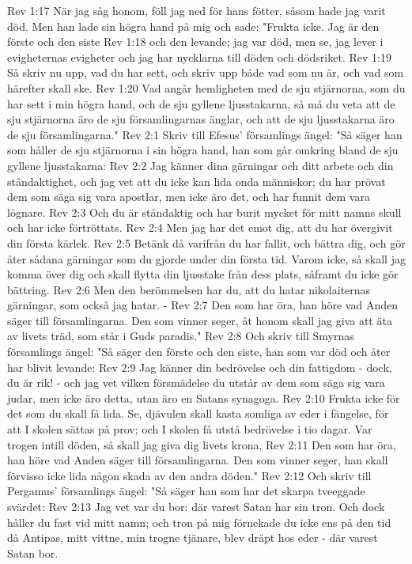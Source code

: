 Rev 1:17  När jag såg honom, föll jag ned för hans fötter, såsom hade jag varit död. Men han lade sin högra hand på mig och sade: "Frukta icke. Jag är den förste och den siste
Rev 1:18  och den levande; jag var död, men se, jag lever i evigheternas evigheter och jag har nycklarna till döden och dödsriket.
Rev 1:19  Så skriv nu upp, vad du har sett, och skriv upp både vad som nu är, och vad som härefter skall ske.
Rev 1:20  Vad angår hemligheten med de sju stjärnorna, som du har sett i min högra hand, och de sju gyllene ljusstakarna, så må du veta att de sju stjärnorna äro de sju församlingarnas änglar, och att de sju ljusstakarna äro de sju församlingarna."
Rev 2:1  Skriv till Efesus' församlings ängel: "Så säger han som håller de sju stjärnorna i sin högra hand, han som går omkring bland de sju gyllene ljusstakarna:
Rev 2:2  Jag känner dina gärningar och ditt arbete och din ståndaktighet, och jag vet att du icke kan lida onda människor; du har prövat dem som säga sig vara apostlar, men icke äro det, och har funnit dem vara lögnare.
Rev 2:3  Och du är ståndaktig och har burit mycket för mitt namns skull och har icke förtröttats.
Rev 2:4  Men jag har det emot dig, att du har övergivit din första kärlek.
Rev 2:5  Betänk då varifrån du har fallit, och bättra dig, och gör åter sådana gärningar som du gjorde under din första tid. Varom icke, så skall jag komma över dig och skall flytta din ljusstake från dess plats, såframt du icke gör bättring.
Rev 2:6  Men den berömmelsen har du, att du hatar nikolaiternas gärningar, som också jag hatar. -
Rev 2:7  Den som har öra, han höre vad Anden säger till församlingarna. Den som vinner seger, åt honom skall jag giva att äta av livets träd, som står i Guds paradis."
Rev 2:8  Och skriv till Smyrnas församlings ängel: "Så säger den förste och den siste, han som var död och åter har blivit levande:
Rev 2:9  Jag känner din bedrövelse och din fattigdom - dock, du är rik! - och jag vet vilken försmädelse du utstår av dem som säga sig vara judar, men icke äro detta, utan äro en Satans synagoga.
Rev 2:10  Frukta icke för det som du skall få lida. Se, djävulen skall kasta somliga av eder i fängelse, för att I skolen sättas på prov; och I skolen få utstå bedrövelse i tio dagar. Var trogen intill döden, så skall jag giva dig livets krona,
Rev 2:11  Den som har öra, han höre vad Anden säger till församlingarna. Den som vinner seger, han skall förvisso icke lida någon skada av den andra döden."
Rev 2:12  Och skriv till Pergamus' församlings ängel: "Så säger han som har det skarpa tveeggade svärdet:
Rev 2:13  Jag vet var du bor: där varest Satan har sin tron. Och dock håller du fast vid mitt namn; och tron på mig förnekade du icke ens på den tid då Antipas, mitt vittne, min trogne tjänare, blev dräpt hos eder - där varest Satan bor.
